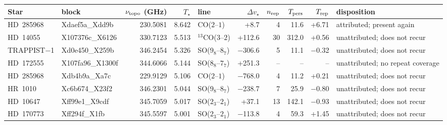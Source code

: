 \begin{tabular}{@{}l@{~}l@{~}r@{~}r@{~}l@{~}r@{~~}r@{~}r@{~}r@{~}l@{}}
\hline
Star & block & $\nu_{\rm topo}$ (GHz) & $T_\star$ & line & $\Delta v_\star$ & $n_{\rm rep}$ & $T_{\rm pers}$ & $T_{\rm rep}$ & disposition \\
\hline
HD~285968 & Xdaef5a\_Xdd9b & 230.5081 & 8.642 & CO($2$--$1$) & +8.7 & 4 & 11.6 & +6.71 & attributed; present again \\
HD~14055 & X107376c\_X6126 & 330.7123 & 5.513 & $^{13}$CO($3$--$2$) & +112.6 & 30 & 312.0 & +0.56 & unattributed; does not recur \\
TRAPPIST$-$1 & Xd0e450\_X259b & 346.2454 & 5.326 & SO($9_{8}$--$8_{7}$) & \ensuremath{-}306.6 & 5 & 11.1 & \ensuremath{-}0.32 & unattributed; does not recur \\
HD~172555 & X107fa96\_X1300f & 344.6066 & 5.144 & SO($8_{8}$--$7_{7}$) & +251.3 & -- & -- & -- & unattributed; no repeat coverage \\
HD~285968 & Xdb4b9a\_Xa7c & 229.9129 & 5.106 & CO($2$--$1$) & \ensuremath{-}768.0 & 4 & 11.2 & +0.21 & unattributed; does not recur \\
HR~1010 & Xc6b674\_X23f2 & 346.2301 & 5.044 & SO($9_{8}$--$8_{7}$) & \ensuremath{-}238.7 & 7 & 25.9 & \ensuremath{-}0.80 & unattributed; does not recur \\
HD~10647 & Xff99e1\_X9cdf & 345.7059 & 5.017 & SO($2_{3}$--$2_{1}$) & +37.1 & 13 & 142.1 & \ensuremath{-}0.93 & unattributed; does not recur \\
HD~170773 & Xff294f\_X1fb & 345.5597 & 5.001 & SO($2_{3}$--$2_{1}$) & \ensuremath{-}113.8 & 4 & 59.3 & +1.45 & unattributed; does not recur \\
\hline
\end{tabular}
